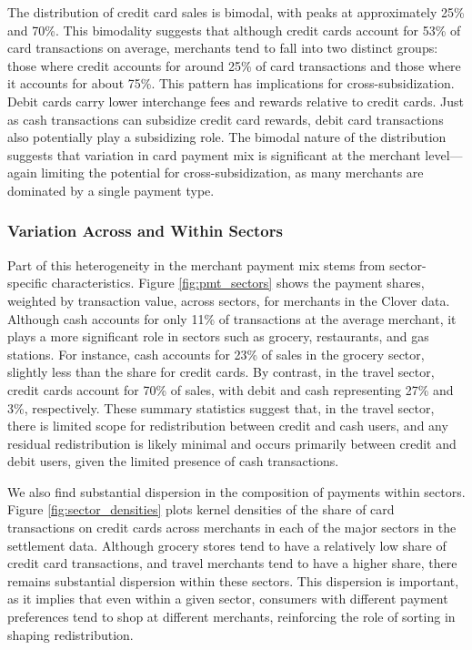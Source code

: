 \documentclass[11pt,english]{article}
\theoremstyle{remark}
\begin{document}
The distribution of credit card sales is bimodal, with peaks at approximately 25\% and 70\%.
This bimodality suggests that although credit cards account for 53\% of card transactions on average, merchants tend to fall into two distinct groups: those where credit accounts for around 25\% of card transactions and those where it accounts for about 75\%.
This pattern has implications for cross-subsidization.
Debit cards carry lower interchange fees and rewards relative to credit cards.
Just as cash transactions can subsidize credit card rewards, debit card transactions also potentially play a subsidizing role.
The bimodal nature of the distribution suggests that variation in card payment mix is significant at the merchant level---again limiting the potential for cross-subsidization, as many merchants are dominated by a single payment type.

\subsubsection{Variation Across and Within Sectors}

Part of this heterogeneity in the merchant payment mix stems from sector-specific characteristics.
Figure \ref{fig:pmt_sectors} shows the payment shares, weighted by transaction value, across sectors, for merchants in the Clover data.
Although cash accounts for only 11\% of transactions at the average merchant, it plays a more significant role in sectors such as grocery, restaurants, and gas stations.
For instance, cash accounts for 23\% of sales in the grocery sector, slightly less than the share for credit cards.
By contrast, in the travel sector, credit cards account for 70\% of sales, with debit and cash representing 27\% and 3\%, respectively.
These summary statistics suggest that, in the travel sector, there is limited scope for redistribution between credit and cash users, and any residual redistribution is likely minimal and occurs primarily between credit and debit users, given the limited presence of cash transactions.

We also find substantial dispersion in the composition of payments within sectors.
Figure \ref{fig:sector_densities} plots kernel densities of the share of card transactions on credit cards across merchants in each of the major sectors in the settlement data.
Although grocery stores tend to have a relatively low share of credit card transactions, and travel merchants tend to have a higher share, there remains substantial dispersion within these sectors.
This dispersion is important, as it implies that even within a given sector, consumers with different payment preferences tend to shop at different merchants, reinforcing the role of sorting in shaping redistribution.
\end{document}
